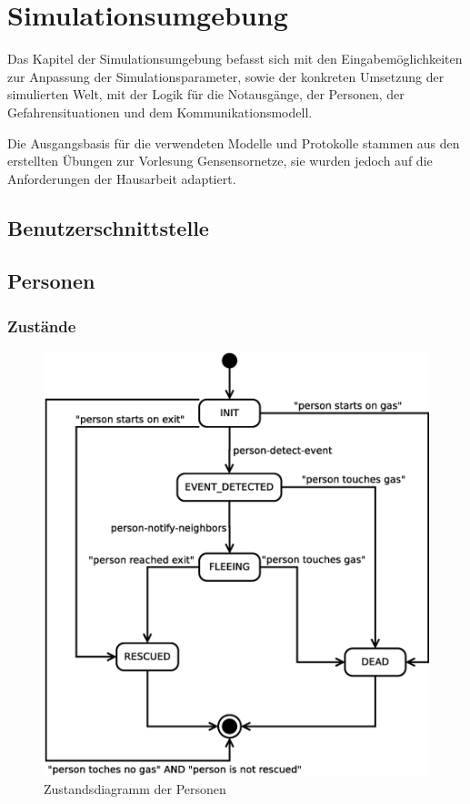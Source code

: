 \chapter{Simulationsumgebung}
\label{cha:simulationsumgebung}

Das Kapitel der Simulationsumgebung befasst sich mit den Eingabemöglichkeiten zur Anpassung der Simulationsparameter, sowie der konkreten Umsetzung der simulierten Welt, mit der Logik für die Notausgänge, der Personen, der Gefahrensituationen und dem Kommunikationsmodell.

Die Ausgangsbasis für die verwendeten Modelle und Protokolle stammen aus den erstellten Übungen zur Vorlesung Gensensornetze, sie wurden jedoch auf die Anforderungen der Hausarbeit adaptiert.

\section{Benutzerschnittstelle}
\label{sec:benutzerschnittstelle}


\section{Personen}
\label{sec:personen}

\subsection{Zustände}


\begin{figure}
\centering
\includegraphics[height=0.6\textwidth]{simulationsumgebung/person.eps}
\caption{Zustandsdiagramm der Personen}
\label{fig:person}
\end{figure}

